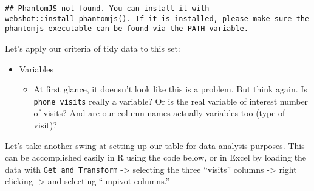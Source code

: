 \documentclass[]{book}
\newenvironment{Shaded}{\begin{snugshade}}{\end{snugshade}}
\newcommand{\KeywordTok}[1]{\textcolor[rgb]{0.13,0.29,0.53}{\textbf{#1}}}
\newcommand{\DataTypeTok}[1]{\textcolor[rgb]{0.13,0.29,0.53}{#1}}
\newcommand{\StringTok}[1]{\textcolor[rgb]{0.31,0.60,0.02}{#1}}
\newcommand{\CommentTok}[1]{\textcolor[rgb]{0.56,0.35,0.01}{\textit{#1}}}
\newcommand{\OperatorTok}[1]{\textcolor[rgb]{0.81,0.36,0.00}{\textbf{#1}}}
\newcommand{\NormalTok}[1]{#1}
\providecommand{\tightlist}{%
  \setlength{\itemsep}{0pt}\setlength{\parskip}{0pt}}
\begin{document}
\begin{Shaded}
\end{Shaded}

\begin{verbatim}
## PhantomJS not found. You can install it with webshot::install_phantomjs(). If it is installed, please make sure the phantomjs executable can be found via the PATH variable.
\end{verbatim}

\hypertarget{htmlwidget-44734aa92161ddd6c711}{}

Let's apply our criteria of tidy data to this set:

\begin{itemize}
\tightlist
\item
  Variables

  \begin{itemize}
  \tightlist
  \item
    At first glance, it doensn't look like this is a problem. But think
    again. Is \texttt{phone\ visits} really a variable? Or is the real
    variable of interest number of visits? And are our column names
    actually variables too (type of visit)?
  \end{itemize}
\end{itemize}

Let's take another swing at setting up our table for data analysis
purposes. This can be accomplished easily in R using the code below, or
in Excel by loading the data with \texttt{Get\ and\ Transform}
-\textgreater{} selecting the three ``visits'' columns -\textgreater{}
right clicking -\textgreater{} and selecting ``unpivot columns.''

\begin{Shaded}
\end{Shaded}
\end{document}
